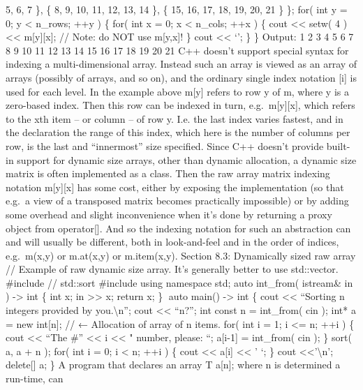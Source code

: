 5, 6, 7 \}, \{ 8, 9, 10, 11, 12, 13, 14 \}, \{ 15, 16, 17, 18, 19, 20,
21 \} \}; for( int y = 0; y \textless{} n\_rows; ++y ) \{ for( int x =
0; x \textless{} n\_cols; ++x ) \{ cout \textless\textless{} setw( 4 )
\textless\textless{} m{[}y{]}{[}x{]}; // Note: do NOT use m{[}y,x{]}! \}
cout \textless\textless{} `\n'; \} \} Output: 1 2 3 4 5 6 7 8 9 10 11 12
13 14 15 16 17 18 19 20 21 C++ doesn't support special syntax for
indexing a multi-dimensional array. Instead such an array is viewed as
an array of arrays (possibly of arrays, and so on), and the ordinary
single index notation {[}i{]} is used for each level. In the example
above m{[}y{]} refers to row y of m, where y is a zero-based index. Then
this row can be indexed in turn, e.g.~m{[}y{]}{[}x{]}, which refers to
the xth item -- or column -- of row y. I.e. the last index varies
fastest, and in the declaration the range of this index, which here is
the number of columns per row, is the last and ``innermost'' size
speciﬁed. Since C++ doesn't provide built-in support for dynamic size
arrays, other than dynamic allocation, a dynamic size matrix is often
implemented as a class. Then the raw array matrix indexing notation
m{[}y{]}{[}x{]} has some cost, either by exposing the implementation (so
that e.g.~a view of a transposed matrix becomes practically impossible)
or by adding some overhead and slight inconvenience when it's done by
returning a proxy object from operator{[}{]}. And so the indexing
notation for such an abstraction can and will usually be diﬀerent, both
in look-and-feel and in the order of indices, e.g.~m(x,y) or m.at(x,y)
or m.item(x,y). Section 8.3: Dynamically sized raw array // Example of
raw dynamic size array. It's generally better to use std::vector.
\#include // std::sort \#include using namespace std; auto int\_from(
istream\& in ) -\textgreater{} int \{ int x; in
\textgreater\textgreater{} x; return x; \} auto main() -\textgreater{}
int \{ cout \textless\textless{} ``Sorting n integers provided by
you.\textbackslash n''; cout \textless\textless{} ``n?''; int const n =
int\_from( cin ); int* a = new int{[}n{]}; // ← Allocation of array of n
items. for( int i = 1; i \textless= n; ++i ) \{ cout
\textless\textless{} ``The \#'' \textless\textless{} i
\textless\textless{} " number, please: ``; a{[}i-1{]} = int\_from( cin
); \} sort( a, a + n ); for( int i = 0; i \textless{} n; ++i ) \{ cout
\textless\textless{} a{[}i{]} \textless\textless{} ' `; \} cout
\textless\textless{}'\textbackslash n'; delete{[}{]} a; \} A program
that declares an array T a{[}n{]}; where n is determined a run-time, can
